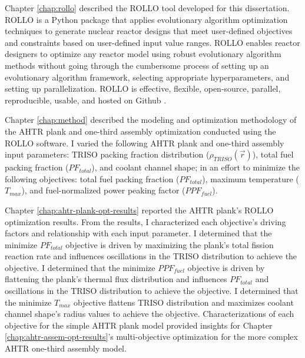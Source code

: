 Chapter \ref{chap:rollo} described the \gls{ROLLO} tool developed for this 
dissertation. 
\gls{ROLLO} is a Python package that applies evolutionary algorithm 
optimization techniques to generate nuclear reactor designs that meet user-defined 
objectives and constraints based on user-defined input value ranges. 
\gls{ROLLO} enables reactor designers to optimize any reactor model using robust 
evolutionary algorithm methods without going through the cumbersome process of setting up 
an evolutionary algorithm framework, selecting appropriate hyperparameters, and 
setting up parallelization.
\gls{ROLLO} is effective, flexible, open-source, parallel, reproducible, usable, and 
hosted on Github \cite{chee_rollo_2021}. 

Chapter \ref{chap:method} described the modeling and optimization methodology of the 
\gls{AHTR} plank and one-third assembly optimization conducted using the \gls{ROLLO} 
software.
I varied the following \gls{AHTR} plank and one-third assembly input parameters: 
\gls{TRISO} packing fraction distribution ($\rho_{TRISO}(\vec{r})$), total fuel 
packing fraction ($PF_{total}$), and coolant channel shape; in an effort to minimize 
the following objectives: total fuel packing fraction ($PF_{total}$), maximum 
temperature ($T_{max}$), and fuel-normalized power peaking factor ($PPF_{fuel}$). 

Chapter \ref{chap:ahtr-plank-opt-results} reported the \gls{AHTR} plank's 
\gls{ROLLO} optimization results.
From the results, I characterized each objective's driving factors and relationship 
with each input parameter. 
I determined that the minimize $PF_{total}$ objective is driven by maximizing the plank's 
total fission reaction rate and influences oscillations in the TRISO distribution to 
achieve the objective. 
I determined that the minimize $PPF_{fuel}$ objective is driven by flattening the plank's
thermal flux distribution and influences $PF_{total}$ and oscillations in the TRISO 
distribution to achieve the objective.
I determined that the minimize $T_{max}$ objective flattens TRISO distribution and 
maximizes coolant channel shape's radius values to achieve the objective.
Characterizations of each objective for the simple \gls{AHTR} plank model provided 
insights for Chapter \ref{chap:ahtr-assem-opt-results}'s multi-objective 
optimization for the more complex \gls{AHTR} one-third assembly model. 

